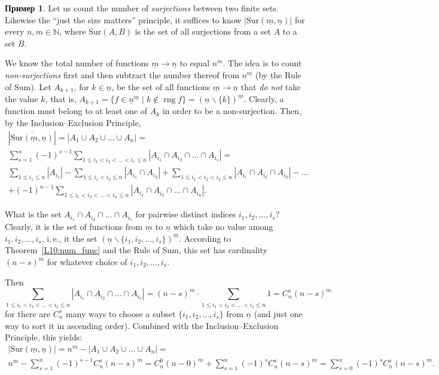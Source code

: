\documentclass[12pt,notitlepage]{article}
\theoremstyle{plain}
\theoremstyle{definition}
\newtheorem{exm}[thm]{Пример}
\theoremstyle{plain}
\newcommand{\N}{\mathbb{N}}
\renewcommand{\setminus}{\smallsetminus}
\newcommand{\rng}{\mathop{\mathrm{rng}}}
\newcommand{\ul}[1]{\underline{#1}}
\newcommand{\1}{\mathbf{1}}
\newcommand{\0}{\mathbf{0}}
\begin{document}
\begin{exm}
	Let us count the number of \emph{surjections} between two finite sets. Likewise the ``just the size matters'' principle, it suffices to know $|\mathrm{Sur}(\ul{m},\ul{n})|$ for every $n, m \in \N$, where $\mathrm{Sur}(A,B)$ is the set of all surjections from a set $A$ to a set $B$.
	
	We know the total number of functions $\ul{m} \to \ul{n}$ to equal $n^m$. The idea is to count \emph{non-surjections} first and then subtract the number thereof from $n^m$ (by the Rule of Sum).  Let $A_{k + 1}$, for $k \in \ul{n}$, be the set of all functions $\ul{m} \to \ul{n}$ that \emph{do not} take the value $k$, that is, $A_{k + 1} = \{ f \in \ul{n}^{\ul{m}} \mid k \notin \rng f \} = (\ul{n} \setminus \{k\})^{\ul{m}}$. Clearly, a function must belong to at least one of $A_k$ in order to be a non-surjection. Then, by the Inclusion--Exclusion Principle,
	\begin{multline*}
		|\overline{\mathrm{Sur}(\ul{m},\ul{n})}| = |A_1 \cup A_2 \cup \ldots \cup  A_n| =\\
		\sum\limits_{s = 1}^n (-1)^{s - 1} \sum\limits_{1\leqslant i_1 < i_2 < \ldots < i_s \leqslant n} |A_{i_1} \cap A_{i_2} \cap \ldots \cap A_{i_s}| =\\
		\sum\limits_{1\leqslant i_1 \leqslant n} |A_{i_1}| - \sum\limits_{1\leqslant i_1 < i_2 \leqslant n} |A_{i_1} \cap A_{i_2}| + \sum\limits_{1\leqslant i_1 < i_2 < i_3 \leqslant n} |A_{i_1} \cap A_{i_2} \cap A_{i_3}| - \ldots\\
		+ (-1)^{n - 1} \sum\limits_{1\leqslant i_1 < i_2 < \ldots < i_n \leqslant n} |A_{i_1} \cap A_{i_2} \cap \ldots \cap A_{i_n}|.
	\end{multline*}
\end{exm}
What is the set $A_{i_1} \cap A_{i_2} \cap \ldots \cap  A_{i_s}$ for pairwise distinct indices $i_1, i_2, \ldots, i_s$? Clearly, it is the set of functions from $\ul{m}$ to $\ul{n}$ which take no value among $i_1, i_2, \ldots, i_s$, i.\,e., it the set $(\ul{n} \setminus \{ i_1, i_2, \ldots, i_s \})^{\ul{m}}$. According to Theorem~\ref{L10:num_func} and the Rule of Sum, this set has cardinality $(n - s)^m$ for whatever choice of $i_1, i_2, \ldots, i_s$.

Then
$$\sum\limits_{1\leqslant i_1 < i_2 < \ldots  < i_s \leqslant n} |A_{i_1} \cap A_{i_2} \cap \ldots \cap A_{i_s}| = (n - s)^m \cdot \sum\limits_{1\leqslant i_1 < i_2 < \ldots  < i_s \leqslant n} 1 = C_n^s (n-s)^m$$
for there are $C_n^s$ many ways to choose a subset $\{ i_1, i_2, \ldots, i_s \}$ from $\ul{n}$ (and just one way to sort it in ascending order). Combined with the Inclusion--Exclusion Principle, this yields:
\begin{multline*}
	|\mathrm{Sur}(\ul{m},\ul{n})| = n^m - |A_1 \cup A_2 \cup \ldots \cup A_n| =\\
	n^m - \sum\limits_{s = 1}^{n} (-1)^{s - 1} C_n^s (n-s)^m = C_n^0 (n - 0)^m + \sum\limits_{s = 1}^{n} (-1)^{s} C_n^s (n-s)^m = \sum\limits_{s = 0}^{n} (-1)^{s} C_n^s (n-s)^m.
\end{multline*}
\end{document}
